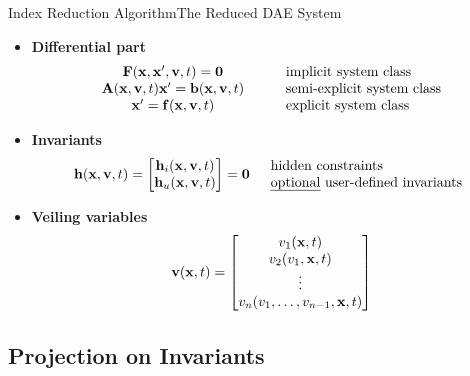 \begin{frame}{Index Reduction Algorithm}{The Reduced \acs{DAE} System}
  \vspace{-1.0em}
  \begin{itemize}[<+->]
    \item \textbf{Differential part}
    \begin{equation*}
      \begin{array}{ccl}
          \mathbf{F}(\mathbf{x}, \mathbf{x}^\prime, \mathbf{v}, t) = \mathbf{0} & \quad & \text{implicit  system class} \\
          \mathbf{A}(\mathbf{x}, \mathbf{v}, t) \mathbf{x}^\prime = \mathbf{b}(\mathbf{x}, \mathbf{v}, t) & \quad & \text{semi-explicit system class} \\
          \mathbf{x}^\prime = \mathbf{f}(\mathbf{x}, \mathbf{v}, t) & \quad & \text{explicit system class}
      \end{array}
    \end{equation*}
    \item \textbf{Invariants}
    \begin{equation*}
      \mathbf{h}(\mathbf{x}, \mathbf{v}, t) = \begin{bmatrix}
          \mathbf{h}_{i}(\mathbf{x}, \mathbf{v}, t) \\
          \mathbf{h}_{u}(\mathbf{x}, \mathbf{v}, t)
      \end{bmatrix} = \mathbf{0} \quad \begin{array}{l}
        \text{hidden constraints} \\
        \text{\emph{optional} user-defined invariants}
        \end{array}
    \end{equation*}
    \item \textbf{Veiling variables}
    \begin{equation*}
        \mathbf{v}(\mathbf{x}, t) = \begin{bmatrix}
            v_{1}(\mathbf{x}, t) \\
            v_{2}(v_{1}, \mathbf{x}, t) \\
            \vdots \\
            v_{n}(v_{1}, \dots, v_{n-1}, \mathbf{x}, t)
        \end{bmatrix}
    \end{equation*}
  \end{itemize}
\end{frame}

\subsection{Projection on Invariants}

